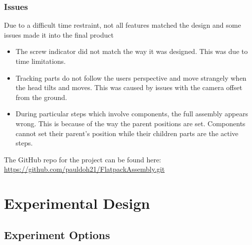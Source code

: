 \documentclass{l4proj}
\begin{document}
\subsection{Issues}

Due to a difficult time restraint, not all features matched the design and some issues made it into the final product

\begin{itemize}
    \item The screw indicator did not match the way it was designed. This was due to time limitations.
    \item Tracking parts do not follow the users perspective and move strangely when the head tilts and moves. This was caused by issues with the camera offset from the ground.
    \item During particular steps which involve components, the full assembly appears wrong. This is because of the way the parent positions are set. Components cannot set their parent's position while their children parts are the active steps.
\end{itemize}

The GitHub repo for the project can be found here: \url{https://github.com/pauldoh21/FlatpackAssembly.git}


\chapter{Experimental Design}
\label{chap:expdesign}

\section{Experiment Options}
\end{document}
